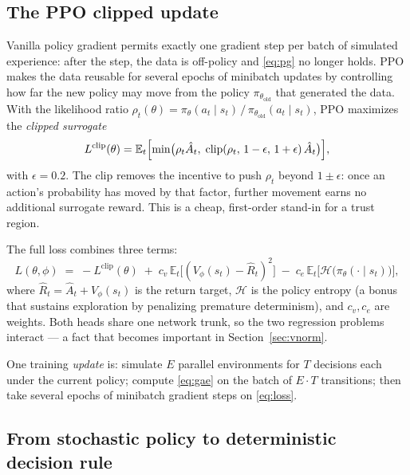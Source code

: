 \documentclass[11pt,a4paper]{article}
\newcommand{\E}{\mathbb{E}}
\newcommand{\clip}{\operatorname{clip}}
\begin{document}
\subsection{The PPO clipped update}

Vanilla policy gradient permits exactly one gradient step per batch of
simulated experience: after the step, the data is off-policy and
\eqref{eq:pg} no longer holds.  PPO makes the data reusable for several
epochs of minibatch updates by controlling how far the new policy may
move from the policy $\pi_{\theta_{\mathrm{old}}}$ that generated the
data.  With the likelihood ratio
$\rho_t(\theta) = \pi_\theta(a_t \mid s_t)\,/\,
\pi_{\theta_{\mathrm{old}}}(a_t \mid s_t)$,
PPO maximizes the \emph{clipped surrogate}
\begin{equation}
  L^{\mathrm{clip}}(\theta) =
  \E_t\Bigl[\min\bigl(\rho_t \hat A_t,\;
      \clip(\rho_t,\, 1-\epsilon,\, 1+\epsilon)\, \hat A_t\bigr)\Bigr],
  \label{eq:clip}
\end{equation}
with $\epsilon = 0.2$.  The clip removes the incentive to push
$\rho_t$ beyond $1 \pm \epsilon$: once an action's probability has moved
by that factor, further movement earns no additional surrogate reward.
This is a cheap, first-order stand-in for a trust region.

The full loss combines three terms:
\begin{equation}
  L(\theta,\phi) \;=\; -L^{\mathrm{clip}}(\theta)
  \;+\; c_v \,\E_t\bigl[(V_\phi(s_t) - \hat R_t)^2\bigr]
  \;-\; c_e \,\E_t\bigl[\mathcal H\bigl(\pi_\theta(\cdot \mid s_t)\bigr)\bigr],
  \label{eq:loss}
\end{equation}
where $\hat R_t = \hat A_t + V_\phi(s_t)$ is the return target,
$\mathcal H$ is the policy entropy (a bonus that sustains exploration by
penalizing premature determinism), and $c_v, c_e$ are weights.  Both
heads share one network trunk, so the two regression problems interact
--- a fact that becomes important in Section~\ref{sec:vnorm}.

One training \emph{update} is: simulate $E$ parallel environments for
$T$ decisions each under the current policy; compute
\eqref{eq:gae} on the batch of $E \cdot T$ transitions; then take
several epochs of minibatch gradient steps on \eqref{eq:loss}.

\subsection{From stochastic policy to deterministic decision rule}
\label{sec:extraction}
\end{document}
